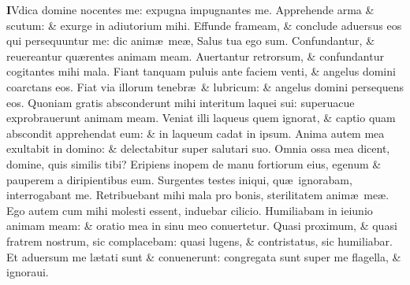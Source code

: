 \documentclass[a5paper,10pt]{book}
\def\ae{æ}
\begin{document}
\begin{multicols*}{2}
\lettrine[lines=2]{\bfseries \color{red} I}{}Vdica domine nocentes me: expugna impugnantes me.
\newline \color{red} A\color{black}pprehende arma \& scutum: \& exurge in adiutorium mihi.
\newline \color{red} E\color{black}ffunde frameam, \& conclude aduersus eos qui persequuntur me: dic anim\ae \ me\ae , Salus tua ego sum.
\newline \color{red} C\color{black}onfundantur, \& reuereantur qu\ae rentes animam meam.
\newline \color{red} A\color{black}uertantur retrorsum, \& confundantur cogitantes mihi mala.
\newline \color{red} F\color{black}iant tanquam puluis ante faciem venti, \& angelus domini coarctans eos.
\newline \color{red} F\color{black}iat via illorum tenebr\ae \ \& lubricum: \& angelus domini persequens eos.
\newline \color{red} Q\color{black}uoniam gratis absconderunt mihi interitum laquei sui: superuacue exprobrauerunt animam meam.
\newline \color{red} V\color{black}eniat illi laqueus quem ignorat, \& captio quam abscondit apprehendat eum: \& in laqueum cadat in ipsum.
\newline \color{red} A\color{black}nima autem mea exultabit in domino: \& delectabitur super salutari suo.
\newline \color{red} O\color{black}mnia ossa mea dicent, domine, quis similis tibi?
\newline \color{red} E\color{black}ripiens inopem de manu fortiorum eius, egenum \& pauperem a diripientibus eum.
\newline \color{red} S\color{black}urgentes testes iniqui, qu\ae \ ignorabam, interrogabant me.
\newline \color{red} R\color{black}etribuebant mihi mala pro bonis, sterilitatem anim\ae \ me\ae .
\newline \color{red} E\color{black}go autem cum mihi molesti essent, induebar cilicio.
\newline \color{red} H\color{black}umiliabam in ieiunio animam meam: \& oratio mea in sinu meo conuertetur.
\newline \color{red} Q\color{black}uasi proximum, \& quasi fratrem nostrum, sic complacebam: quasi lugens, \& contristatus, sic humiliabar.
\newline \color{red} E\color{black}t aduersum me l\ae tati sunt \& conuenerunt: congregata sunt super me flagella, \& ignoraui.

\end{multicols*}
\end{document}
